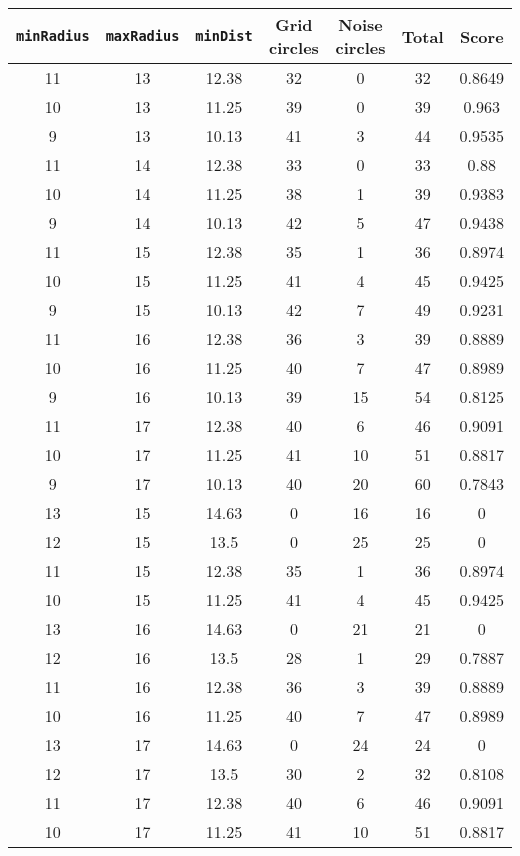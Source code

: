 \documentclass[letterpaper, 12pt]{article}
\begin{document}
\begin{longtable}{|c|c|c|c|c|c|c|}
\hline
\textbf{\texttt{minRadius}} & \textbf{\texttt{maxRadius}} & \textbf{\texttt{minDist}} & \textbf{Grid circles} & \textbf{Noise circles} & \textbf{Total} & \textbf{Score} \\
\hline
11 & 13 & 12.38 & 32 & 0 & 32 & 0.8649 \\
\hline
10 & 13 & 11.25 & 39 & 0 & 39 & 0.963 \\
\hline
9 & 13 & 10.13 & 41 & 3 & 44 & 0.9535 \\
\hline
11 & 14 & 12.38 & 33 & 0 & 33 & 0.88 \\
\hline
10 & 14 & 11.25 & 38 & 1 & 39 & 0.9383 \\
\hline
9 & 14 & 10.13 & 42 & 5 & 47 & 0.9438 \\
\hline
11 & 15 & 12.38 & 35 & 1 & 36 & 0.8974 \\
\hline
10 & 15 & 11.25 & 41 & 4 & 45 & 0.9425 \\
\hline
9 & 15 & 10.13 & 42 & 7 & 49 & 0.9231 \\
\hline
11 & 16 & 12.38 & 36 & 3 & 39 & 0.8889 \\
\hline
10 & 16 & 11.25 & 40 & 7 & 47 & 0.8989 \\
\hline
9 & 16 & 10.13 & 39 & 15 & 54 & 0.8125 \\
\hline
11 & 17 & 12.38 & 40 & 6 & 46 & 0.9091 \\
\hline
10 & 17 & 11.25 & 41 & 10 & 51 & 0.8817 \\
\hline
9 & 17 & 10.13 & 40 & 20 & 60 & 0.7843 \\
\hline
13 & 15 & 14.63 & 0 & 16 & 16 & 0 \\
\hline
12 & 15 & 13.5 & 0 & 25 & 25 & 0 \\
\hline
11 & 15 & 12.38 & 35 & 1 & 36 & 0.8974 \\
\hline
10 & 15 & 11.25 & 41 & 4 & 45 & 0.9425 \\
\hline
13 & 16 & 14.63 & 0 & 21 & 21 & 0 \\
\hline
12 & 16 & 13.5 & 28 & 1 & 29 & 0.7887 \\
\hline
11 & 16 & 12.38 & 36 & 3 & 39 & 0.8889 \\
\hline
10 & 16 & 11.25 & 40 & 7 & 47 & 0.8989 \\
\hline
13 & 17 & 14.63 & 0 & 24 & 24 & 0 \\
\hline
12 & 17 & 13.5 & 30 & 2 & 32 & 0.8108 \\
\hline
11 & 17 & 12.38 & 40 & 6 & 46 & 0.9091 \\
\hline
10 & 17 & 11.25 & 41 & 10 & 51 & 0.8817 \\

\end{longtable}
\end{document}
